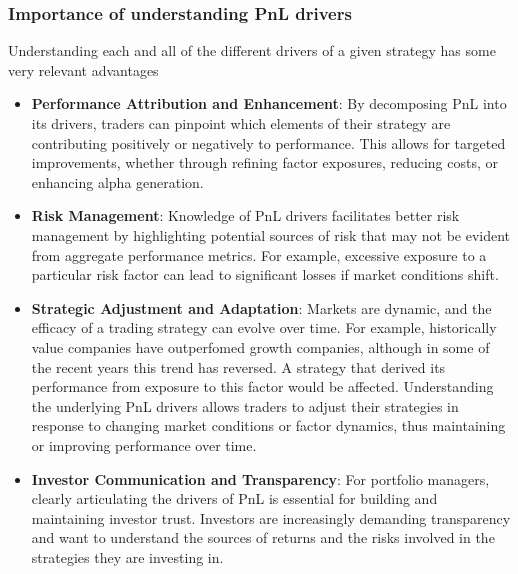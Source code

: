 \subsubsection{Importance of understanding PnL drivers}
Understanding each and all of the different drivers of a given strategy has some very relevant advantages
\begin{itemize}
    \item \textbf{Performance Attribution and Enhancement}: By decomposing PnL into its drivers, traders can pinpoint which elements of their strategy are contributing positively or negatively to performance. This allows for targeted improvements, whether through refining factor exposures, reducing costs, or enhancing alpha generation. \cite{grinold_kahn_1999}
    \item \textbf{Risk Management}: Knowledge of PnL drivers facilitates better risk management by highlighting potential sources of risk that may not be evident from aggregate performance metrics. For example, excessive exposure to a particular risk factor can lead to significant losses if market conditions shift. \cite{ang_2014}
    \item \textbf{Strategic Adjustment and Adaptation}: Markets are dynamic, and the efficacy of a trading strategy can evolve over time. For example, historically value companies have outperfomed growth companies, although in some of the recent years this trend has reversed. A strategy that derived its performance from exposure to this factor would be affected. Understanding the underlying PnL drivers allows traders to adjust their strategies in response to changing market conditions or factor dynamics, thus maintaining or improving performance over time. \cite{lo_2004}
    \item \textbf{Investor Communication and Transparency}: For portfolio managers, clearly articulating the drivers of PnL is essential for building and maintaining investor trust. Investors are increasingly demanding transparency and want to understand the sources of returns and the risks involved in the strategies they are investing in. \cite{elif_baykal_2019}
\end{itemize}
